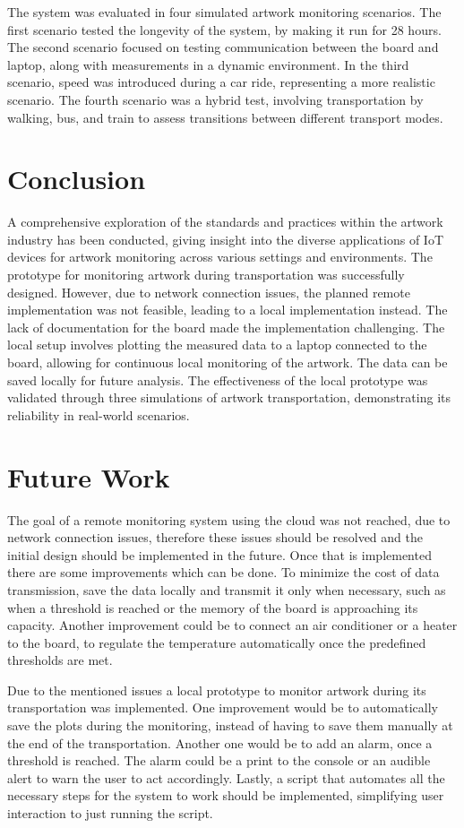 The system was evaluated in four simulated artwork monitoring scenarios. The first scenario tested the longevity of the system, by making it run for 28 hours. The second scenario focused on testing communication between the board and laptop, along with measurements in a dynamic environment. In the third scenario, speed was introduced during a car ride, representing a more realistic scenario. The fourth scenario was a hybrid test, involving transportation by walking, bus, and train to assess transitions between different transport modes.

\section{Conclusion}
A comprehensive exploration of the standards and practices within the artwork industry has been conducted, giving insight into the diverse applications of IoT devices for artwork monitoring across various settings and environments.
The prototype for monitoring artwork during transportation was successfully designed. However, due to network connection issues, the planned remote implementation was not feasible, leading to a local implementation instead. The lack of documentation for the board made the implementation challenging. The local setup involves plotting the measured data to a laptop connected to the board, allowing for continuous local monitoring of the artwork. The data can be saved locally for future analysis. The effectiveness of the local prototype was validated through three simulations of artwork transportation, demonstrating its reliability in real-world scenarios.

\section{Future Work}
The goal of a remote monitoring system using the cloud was not reached, due to network connection issues, therefore these issues should be resolved and the initial design should be implemented in the future. Once that is implemented there are some improvements which can be done. To minimize the cost of data transmission, save the data locally and transmit it only when necessary, such as when a threshold is reached or the memory of the board is approaching its capacity. Another improvement could be to connect an air conditioner or a heater to the board, to regulate the temperature automatically once the predefined thresholds are met.

Due to the mentioned issues a local prototype to monitor artwork during its transportation was implemented. One improvement would be to automatically save the plots during the monitoring, instead of having to save them manually at the end of the transportation. Another one would be to add an alarm, once a threshold is reached. The alarm could be a print to the console or an audible alert to warn the user to act accordingly. Lastly, a script that automates all the necessary steps for the system to work should be implemented, simplifying user interaction to just running the script.